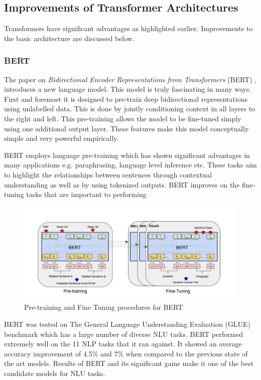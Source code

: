 \documentclass[a4paper,12pt]{report}
\begin{document}
		\subsection{Improvements of Transformer Architectures}\label{232}

            Transformers have significant advantages as highlighted earlier. Improvements to the basic architecture are discussed below.
		\subsubsection{BERT}\label{2321}

			The paper on \textit{Bidirectional Encoder Representations from Transformers} (BERT) \citep{bert}, introduces a new language model. This model is truly fascinating in many ways. First and foremost it is designed to pre-train deep bidirectional representations using unlabelled data. This is done by jointly conditioning context in all layers to the right and left. This pre-training allows the model to be fine-tuned simply using one additional output layer. These features make this model conceptually simple and very powerful empirically.

			BERT employs language pre-training \citep{dai, deepContextualized, radford2018improving} which has shown significant advantages in many applications e.g. paraphrasing, language level inference etc. These tasks aim to highlight the relationships between sentences through contextual understanding as well as by using tokenized outputs. BERT improves on the fine-tuning tasks that are important to performing
			\begin{figure}[h!]
				\centering
				\includegraphics[scale=0.35]{../images/BERT.png}
				\caption{Pre-training and Fine Tuning procedures for BERT \citep{bert}}\label{bertPretraining}
			\end{figure}

			BERT was tested on The General Language Understanding Evaluation (GLUE) benchmark \citep{wang} which has a large number of diverse NLU tasks.
			BERT performed extremely well on the 11 NLP tasks that it ran against. It showed an average accuracy improvement of 4.5\% and 7\% when compared to the previous state of the art models. Results of BERT and its significant gains make it one of the best candidate models for NLU tasks.
\end{document}
